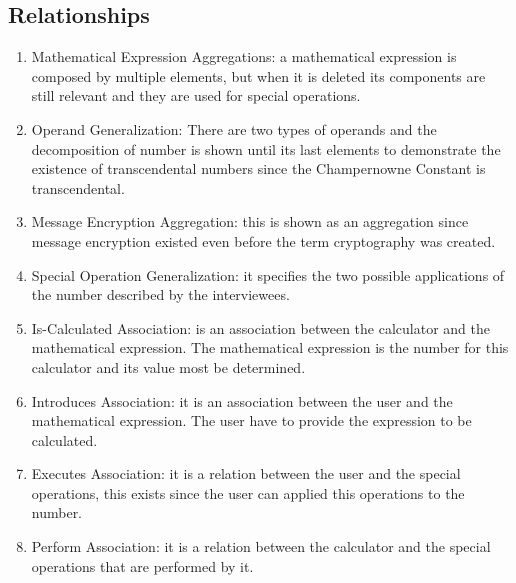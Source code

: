\documentclass{report}
\begin{document}
\subsection{Relationships}

\begin{enumerate}
\item Mathematical Expression Aggregations: a mathematical expression is composed by multiple elements, but when it is deleted its components are still relevant and they are used for special operations.\newline

\item Operand Generalization: There are two types of operands and the decomposition of number is shown until its last elements to demonstrate the existence of transcendental numbers since the Champernowne Constant is transcendental.\newline

\item Message Encryption Aggregation: this is shown as an aggregation since message encryption existed even before the term cryptography was created.

\item Special Operation Generalization: it specifies the two possible applications of the number described by the interviewees.\newline

\item Is-Calculated Association: is an association between the calculator and the mathematical expression. The mathematical expression is the number for this calculator and its value most be determined.\newline

\item Introduces Association: it is an association between the user and the mathematical expression. The user have to provide the expression to be calculated.\newline

\item Executes Association: it is a relation between the user and the special operations, this exists since the user can applied this operations to the number.\newline

\item Perform Association: it is a relation between the calculator and the special operations that are performed by it.\newline


\end{enumerate}
\end{document}
